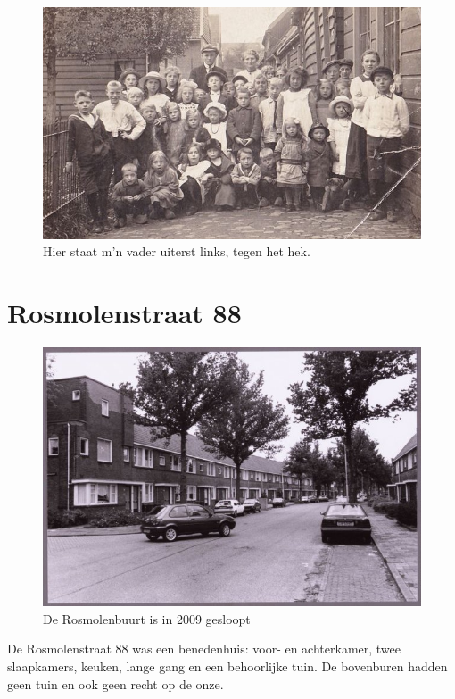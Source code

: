 \documentclass[10pt,twoside, openright]{memoir}
\begin{document}
\begin{figure}
\includegraphics[width=\textwidth]{img/ch2/ch2-afb13}
\caption*{\footnotesize Hier staat m’n vader uiterst links, tegen het hek.}
\end{figure}


\section{Rosmolenstraat 88} %
\label{cha:rosmolenstraat}

\begin{figure}
\includegraphics[width=\textwidth]{img/33Rosmolenstraat}
\caption*{\footnotesize De Rosmolenbuurt is in 2009 gesloopt}
\end{figure}

De Rosmolenstraat 88 was een benedenhuis: voor- en achterkamer, twee slaapkamers, keuken, lange gang en een behoorlijke tuin. De bovenburen hadden geen tuin en ook geen recht op de onze. 
\end{document}
